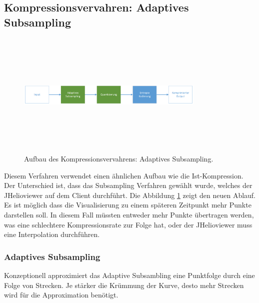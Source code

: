 \subsection{Kompressionsvervahren: Adaptives Subsampling} \label{konzept:loesung0}
\begin{figure}[!htbp]
	\center
	\includegraphics[width=0.8\textwidth,height=6cm,keepaspectratio]{./pictures/konzept/solution0/aufbau.png}
	\caption{Aufbau des Kompressionsvervahrens: Adaptives Subsampling.}
	\label{konzept:loesung0:aufbau:diagramm}
\end{figure} 
Diesem Verfahren verwendet einen ähnlichen Aufbau wie die Ist-Kompression. Der Unterschied ist, dass das Subsampling Verfahren gewählt wurde, welches der JHelioviewer auf dem Client durchführt. Die Abbildung \ref{konzept:loesung0:aufbau:diagramm} zeigt den neuen Ablauf.\\
Es ist möglich dass die Visualisierung zu einem späteren Zeitpunkt mehr Punkte darstellen soll. In diesem Fall müssten entweder mehr Punkte übertragen werden, was eine schlechtere Kompressionsrate zur Folge hat, oder der JHelioviewer muss eine Interpolation durchführen. 

\subsubsection{Adaptives Subsampling}\label{konzept:loesung0:subsampling}
Konzeptionell approximiert das Adaptive Subsambling eine Punktfolge durch eine Folge von Strecken. Je stärker die Krümmung der Kurve, desto mehr Strecken wird für die Approximation benötigt.

